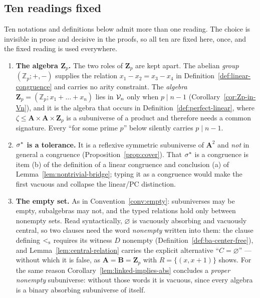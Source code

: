 \subsection{Ten readings fixed}\label{sec:legislation}

Ten notations and definitions below admit more than one reading. The choice is
invisible in prose and decisive in the proofs, so all ten are fixed here, once,
and the fixed reading is used everywhere.

\begin{enumerate}\romanlabels

\item\label{leg:Zp}\textbf{The algebra $\mathbf Z_{p}$.} The two roles of
$\mathbf Z_{p}$ are kept apart. The abelian \emph{group} $(\mathbb Z_{p};+,-)$
supplies the relation $x_{1}-x_{2}=x_{3}-x_{4}$ in
Definition~\ref{def:linear-congruence} and carries no arity constraint. The
\emph{algebra} $\mathbf Z_{p}=(\mathbb Z_{p};x_{1}+\dots+x_{n})$ lies in $\mathcal V_{n}$
only when $p\mid n-1$ (Corollary~\ref{cor:Zp-in-Vn}), and it is the algebra
that occurs in Definition~\ref{def:perfect-linear}, where
$\zeta\le\mathbf A\times\mathbf A\times\mathbf Z_{p}$ is a subuniverse of a
product and therefore needs a common signature. Every ``for some prime $p$''
below silently carries $p\mid n-1$.

\item\label{leg:cover}\textbf{$\sigma^{*}$ is a tolerance.} It is a
reflexive symmetric subuniverse of $\mathbf A^{2}$ and \emph{not} in general a
congruence (Proposition~\ref{prop:cover}). That $\sigma^{*}$ is a congruence
is item (b) of the definition of a linear congruence and conclusion (a) of
Lemma~\ref{lem:nontrivial-bridge}; typing it as a congruence would make the
first vacuous and collapse the linear/PC distinction.

\item\label{leg:empty}\textbf{The empty set.} As in
Convention~\ref{conv:empty}: subuniverses may be empty, subalgebras may not,
and the typed relations hold only between nonempty sets. Read syntactically,
$\varnothing$ is vacuously absorbing and vacuously central, so two clauses need
the word \emph{nonempty} written into them: the clause defining $<_{\textup{\textsc{s}}}^{}$
requires its witness $D$ nonempty (Definition~\ref{def:ba-center-free}), and
Lemma~\ref{lem:central-relation} carries the explicit alternative
``$C=\varnothing$'' --- without which it is false, as
$\mathbf A=\mathbf B=\mathbf Z_{p}$ with $R=\{(x,x+1)\}$ shows. For the same
reason Corollary~\ref{lem:linked-implies-abs} concludes a \emph{proper nonempty}
subuniverse: without those words it is vacuous, since every algebra is a binary
absorbing subuniverse of itself.


\end{enumerate}
